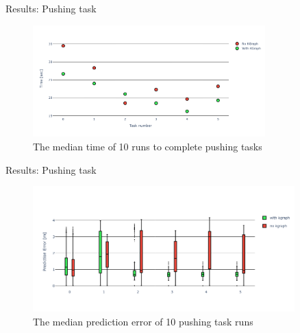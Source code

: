 \begin{frame}[fragile]{Results: Pushing task} 
\begin{center}
  \begin{figure}[H]
      \centering
 \includegraphics[width=0.8\textwidth]{figures/results/random_push_time_vs}
  \caption{The median time of 10 runs to complete pushing tasks}
  \end{figure}
\end{center}
\end{frame}



\begin{frame}[fragile]{Results: Pushing task} 
\begin{center}
  \begin{figure}[H]
      \centering
   \includegraphics[width=0.9\textwidth]{figures/results/random_push_pe_vs}
  \caption{The median prediction error of 10 pushing task runs}
  \end{figure}
\end{center}
\end{frame}


